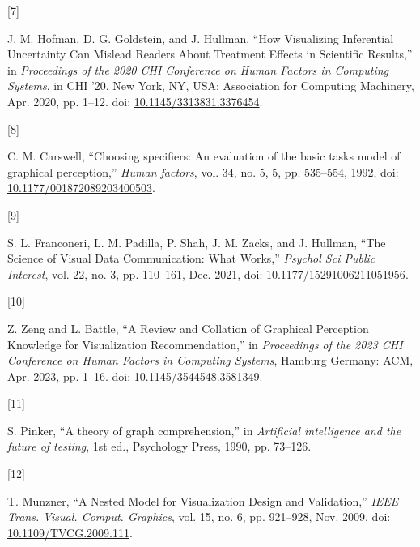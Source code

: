 \documentclass{IEEEcsmag}
\newlength{\cslhangindent}
\newlength{\csllabelwidth}
\newenvironment{CSLReferences}[2] %
 {\begin{list}{}{%
  \setlength{\itemindent}{0pt}
  \setlength{\leftmargin}{0pt}
  \setlength{\parsep}{0pt}
  \ifodd #1
   \setlength{\leftmargin}{\cslhangindent}
   \setlength{\itemindent}{-1\cslhangindent}
  \fi
  \setlength{\itemsep}{#2\baselineskip}}}
 {\end{list}}
\newcommand{\CSLLeftMargin}[1]{\parbox[t]{\csllabelwidth}{#1}}
\newcommand{\CSLRightInline}[1]{\parbox[t]{\linewidth - \csllabelwidth}{#1}\break}
\begin{document}
\begin{CSLReferences}{0}{0}
\CSLLeftMargin{{[}7{]} }%
\CSLRightInline{J. M. Hofman, D. G. Goldstein, and J. Hullman, {``How {Visualizing Inferential Uncertainty Can Mislead Readers About Treatment Effects} in {Scientific Results},''} in \emph{Proceedings of the 2020 {CHI Conference} on {Human Factors} in {Computing Systems}}, in {CHI} '20. New York, NY, USA: Association for Computing Machinery, Apr. 2020, pp. 1--12. doi: \href{https://doi.org/10.1145/3313831.3376454}{10.1145/3313831.3376454}.}

\CSLLeftMargin{{[}8{]} }%
\CSLRightInline{C. M. Carswell, {``Choosing specifiers: {An} evaluation of the basic tasks model of graphical perception,''} \emph{Human factors}, vol. 34, no. 5, 5, pp. 535--554, 1992, doi: \href{https://doi.org/10.1177/001872089203400503}{10.1177/001872089203400503}.}

\CSLLeftMargin{{[}9{]} }%
\CSLRightInline{S. L. Franconeri, L. M. Padilla, P. Shah, J. M. Zacks, and J. Hullman, {``The {Science} of {Visual Data Communication}: {What Works},''} \emph{Psychol Sci Public Interest}, vol. 22, no. 3, pp. 110--161, Dec. 2021, doi: \href{https://doi.org/10.1177/15291006211051956}{10.1177/15291006211051956}.}

\CSLLeftMargin{{[}10{]} }%
\CSLRightInline{Z. Zeng and L. Battle, {``A {Review} and {Collation} of {Graphical Perception Knowledge} for {Visualization Recommendation},''} in \emph{Proceedings of the 2023 {CHI Conference} on {Human Factors} in {Computing Systems}}, Hamburg Germany: ACM, Apr. 2023, pp. 1--16. doi: \href{https://doi.org/10.1145/3544548.3581349}{10.1145/3544548.3581349}.}

\CSLLeftMargin{{[}11{]} }%
\CSLRightInline{S. Pinker, {``A theory of graph comprehension,''} in \emph{Artificial intelligence and the future of testing}, 1st ed., Psychology Press, 1990, pp. 73--126.}

\CSLLeftMargin{{[}12{]} }%
\CSLRightInline{T. Munzner, {``A {Nested Model} for {Visualization Design} and {Validation},''} \emph{IEEE Trans. Visual. Comput. Graphics}, vol. 15, no. 6, pp. 921--928, Nov. 2009, doi: \href{https://doi.org/10.1109/TVCG.2009.111}{10.1109/TVCG.2009.111}.}


\end{CSLReferences}
\end{document}

